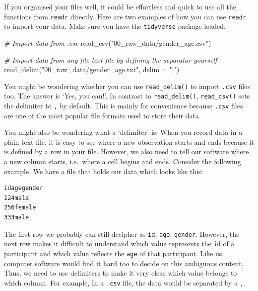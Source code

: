 \documentclass[
]{book}
\newenvironment{Shaded}{\begin{snugshade}}{\end{snugshade}}
\newcommand{\AttributeTok}[1]{\textcolor[rgb]{0.77,0.63,0.00}{#1}}
\newcommand{\CommentTok}[1]{\textcolor[rgb]{0.56,0.35,0.01}{\textit{#1}}}
\newcommand{\FunctionTok}[1]{\textcolor[rgb]{0.00,0.00,0.00}{#1}}
\newcommand{\NormalTok}[1]{#1}
\newcommand{\StringTok}[1]{\textcolor[rgb]{0.31,0.60,0.02}{#1}}
\begin{document}
If you organised your files well, it could be effortless and quick to use all the functions from \texttt{readr} directly. Here are two examples of how you can use \texttt{readr} to import your data. Make sure you have the \texttt{tidyverse} package loaded.

\begin{Shaded}
\begin{Highlighting}[]
\CommentTok{\# Import data from \textquotesingle{}.csv\textquotesingle{}}
\FunctionTok{read\_csv}\NormalTok{(}\StringTok{"00\_raw\_data/gender\_age.csv"}\NormalTok{)}

\CommentTok{\# Import data from any file text file by defining the separator yourself}
\FunctionTok{read\_delim}\NormalTok{(}\StringTok{"00\_raw\_data/gender\_age.txt"}\NormalTok{, }\AttributeTok{delim =} \StringTok{"|"}\NormalTok{)}
\end{Highlighting}
\end{Shaded}

You might be wondering whether you can use \texttt{read\_delim()} to import \texttt{.csv} files too. The answer is `Yes, you can!'. In contrast to \texttt{read\_delim()}, \texttt{read\_csv()} sets the delimiter to \texttt{,} by default. This is mainly for convenience because \texttt{.csv} files are one of the most popular file formats used to store their data.

You might also be wondering what a `delimiter' is. When you record data in a plain-text file, it is easy to see where a new observation starts and ends because it is defined by a row in your file. However, we also need to tell our software where a new column starts, i.e.~where a cell begins and ends. Consider the following example. We have a file that holds our data which looks like this:

\begin{verbatim}
idagegender
124male
256female
333male
\end{verbatim}

The first row we probably can still decipher as \texttt{id}, \texttt{age}, \texttt{gender}. However, the next row makes it difficult to understand which value represents the \texttt{id} of a participant and which value reflects the \texttt{age} of that participant. Like us, computer software would find it hard too to decide on this ambiguous content. Thus, we need to use delimiters to make it very clear which value belongs to which column. For example, In a \texttt{.csv} file, the data would be separated by a \texttt{,}.
\end{document}
